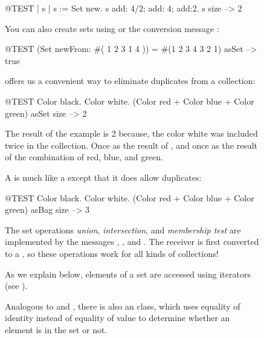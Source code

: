 \documentclass[a4paper,10pt,twoside]{book}
\begin{document}
\begin{figure}
\begin{center}
\begin{code}{@TEST | s | }
s := Set new.
s add: 4/2; add: 4; add:2.
s size --> 2
\end{code}

You can also create sets using  or the conversion message :

\begin{code}{@TEST}
(Set newFrom: #( 1 2 3 1 4 )) = #(1 2 3 4 3 2 1) asSet --> true
\end{code}

 offers us a convenient way to eliminate duplicates from a collection:

\begin{code}{@TEST}
{Color black. Color white. (Color red + Color blue + Color green)} asSet size --> 2
\end{code}

\noindent
The result of the example is 2 because, the color white was included twice in the collection. Once as the result of , and once as the result of the combination of red, blue, and green.

A  is much like a  except that it does allow duplicates:
\begin{code}{@TEST}
{ Color black. Color white. (Color red + Color blue + Color green) } asBag size --> 3
\end{code}

The set operations \emph{union}, \emph{intersection}, and \emph{membership test} are implemented by the  messages , , and .
The receiver is first converted to a , so these operations work for all kinds of collections!


As we explain below, elements of a set are accessed using iterators (see ).

Analogous to  and , there is also an  class, which uses equality of identity instead of equality of value to determine whether an element is in the set or not.


\end{center}
\end{figure}
\end{document}
